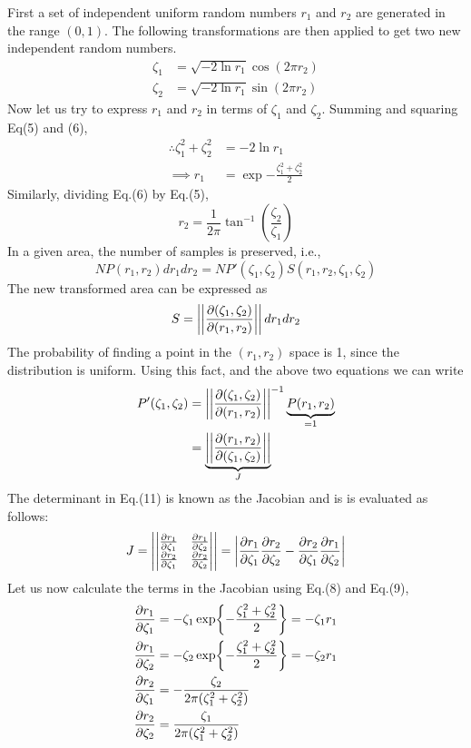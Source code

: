 \documentclass[12pt, oneside]{article}   	%
\begin{document}
First a set of independent uniform random numbers $r_1$ and $r_2$ are generated in the range $(0,1)$.  The following transformations are then applied to get two new independent random numbers.
	\begin{align}
	\zeta_1 &= \sqrt{-2 \ln r_1} \cos{(2 \pi r_2)} \\
	\zeta_2 &= \sqrt{-2 \ln r_1} \sin{(2 \pi r_2)} 
	\end{align}
Now let us try to express $r_1$ and $r_2$ in terms of $\zeta_1$ and $\zeta_2$. Summing and squaring Eq(5) and (6),
	\begin{align}
	\therefore \zeta_1 ^2 + \zeta_2 ^2 &= -2 \ln{r_1} \\
	\implies r_1 &= \exp{-\frac{\zeta_1 ^2 + \zeta_2 ^2}{2}}
	\end{align}
Similarly, dividing Eq.(6) by Eq.(5),
	\begin{equation}
	r_2 = \frac{1}{2\pi} \tan^{-1}{\left( \frac{\zeta_2}{\zeta_1} \right) }
	\end{equation}
In a given area, the number of samples is preserved, i.e.,
	$$N P(r_1,r_2)dr_1 dr_2 = N  P'(\zeta_1, \zeta_2) S(r_1, r_2, \zeta_1,\zeta_2) $$
The new transformed area can be expressed as
	$$ S = \left| \left| \pdv{(\zeta_1, \zeta_2)}{(r_1, r_2)} \right| \right| dr_1 dr_2$$
The probability of finding a point in the $(r_1,r_2)$ space is 1, since the distribution is uniform. Using this fact, and the above two equations we can write
	\begin{align}
		 P'(\zeta_1, \zeta_2) &=\left| \left| \pdv{(\zeta_1, \zeta_2)}{(r_1, r_2)} \right| \right| ^{-1} \underbrace{P(r_1,r_2)}_{\text =1} \\
		 & = \underbrace{\left| \left| \pdv{(r_1, r_2)}{(\zeta_1, \zeta_2)} \right| \right|}_{J}
		 \end{align}
The determinant in Eq.(11) is known as the Jacobian and is is evaluated as follows:
	\begin{align}
		 J = \left| \begin{vmatrix}
		 \pdv{r_1}{\zeta_1} & \pdv{r_1}{\zeta_2} \\
		 \pdv{r_2}{\zeta_1} & \pdv{r_2}{\zeta_2}
		 \end{vmatrix} \right|	 = \left| \pdv{r_1}{\zeta_1} \pdv{r_2}{\zeta_2} - \pdv{r_2}{\zeta_1} \pdv{r_1}{\zeta_2} \right|
	\end{align}
Let us now calculate the terms in the Jacobian using Eq.(8) and Eq.(9),
	\begin{align}
	\pdv{r_1}{\zeta_1} &= -\zeta_1 \exp{-\frac{\zeta_1 ^2 + \zeta_2 ^2}{2}} = -\zeta_1 r_1 \\
	\pdv{r_1}{\zeta_2} &= -\zeta_2 \exp{-\frac{\zeta_1 ^2 + \zeta_2 ^2}{2}} = -\zeta_2 r_1 \\
	\pdv{r_2}{\zeta_1} &= -\frac{\zeta_2}{2\pi(\zeta_1 ^2 + \zeta_2 ^2)} \\
	\pdv{r_2}{\zeta_2} &=  \frac{\zeta_1}{2\pi(\zeta_1 ^2 + \zeta_2 ^2)}
	\end{align}
\end{document}

